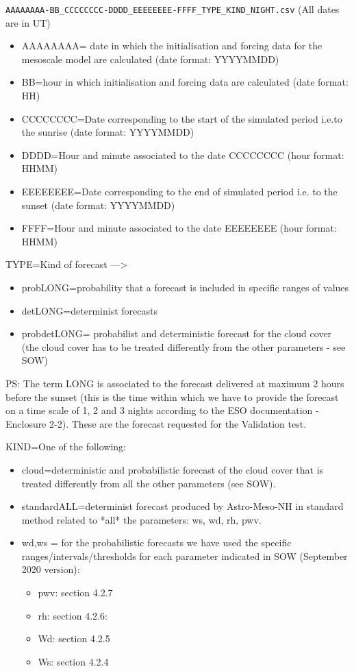 \documentclass[11pt,english]{article}
\begin{document}
\verb+AAAAAAAA-BB_CCCCCCCC-DDDD_EEEEEEEE-FFFF_TYPE_KIND_NIGHT.csv+
(All dates are in UT)
\begin{itemize}
\item AAAAAAAA= date in which the initialisation and forcing data for the mesoscale model are calculated (date format: YYYYMMDD)
\item BB=hour in which initialisation and forcing data are calculated (date format: HH)
\item CCCCCCCC=Date corresponding to the start of the simulated period i.e.to the sunrise (date format: YYYYMMDD)
\item DDDD=Hour and minute associated to the date CCCCCCCC (hour format: HHMM)
\item EEEEEEEE=Date corresponding to the end of simulated period i.e. to the sunset (date format: YYYYMMDD)
\item FFFF=Hour and minute associated to the date EEEEEEEE (hour format: HHMM)
\end{itemize}


TYPE=Kind of forecast ---> 
\begin{itemize}
\item probLONG=probability that a forecast is included in specific ranges of values
\item detLONG=determinist forecasts
\item probdetLONG= probabilist and deterministic forecast for the cloud cover (the cloud cover has to be treated differently from the other parameters - see SOW)
\end{itemize}


PS: The term LONG is associated to the forecast delivered at maximum 2 hours before the sunset (this is the time within which we have to provide the forecast on a time scale of 1, 2 and 3 nights according to the ESO documentation - Enclosure 2-2). These are the forecast requested for the Validation test.


KIND=One of the following:
\begin{itemize}
\item cloud=deterministic and probabilistic forecast of the cloud cover that is treated differently from all the other parameters (see SOW).
\item standardALL=determinist forecast produced by Astro-Meso-NH in standard method related to *all* the parameters: ws, wd, rh, pwv.
\item wd,ws = for the probabilistic forecasts we have used the specific ranges/intervals/thresholds for each parameter indicated in SOW (September 2020 version):
\begin{itemize}
\item pwv: section 4.2.7
\item rh: section 4.2.6:
\item Wd: section 4.2.5
\item Ws: section 4.2.4
\end{itemize}
\end{itemize}
\end{document}
